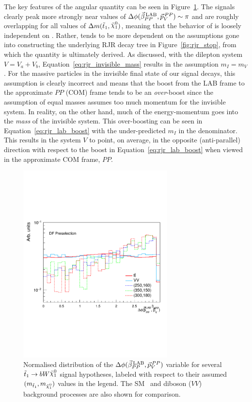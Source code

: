 The key features of the angular quantity \dpb can be seen in Figure~\ref{fig:rjr_DPB}.
The \stopone signals clearly peak more strongly near values of $\Delta \phi (\vec{\beta}_{PP}^{\,\text{LAB}}, \vec{p}_V^{\,PP}) \sim \pi$ and are roughly
overlapping for all values of $\sdiff$, meaning that the behavior of \dpb is loosely
independent on \sdiff.
Rather, \dpb tends to be more dependent on the assumptions gone into constructing the underlying
RJR decay tree in Figure~\ref{fig:rjr_stop}, from which the quantity \dpb is ultimately derived.
As discussed, with the dilepton system $V = V_a + V_b$, Equation~\ref{eq:rjr_invisible_mass} results
in the assumption $m_I = m_V$.
For the massive \ninoone particles in the invisible final state of our \stopone signal decays, this
assumption is clearly incorrect and means that the boost from the LAB frame to the approximate 
$PP$ (COM) frame tends to be an \textit{over}-boost since the assumption of equal masses assumes
too much momentum for the invisible system.
In reality, on the other hand, much of the \stopone energy-momentum goes
into the \textit{mass} of the invisible system.
This over-boosting can be seen in Equation~\ref{eq:rjr_lab_boost} with the under-predicted $m_I$
in the denominator.
This results in the system $V$ to point, on average, in the opposite (anti-parallel) direction with
respect to the boost in Equation~\ref{eq:rjr_lab_boost} when viewed in the approximate COM frame, $PP$.

\begin{figure}[!htb]
    \begin{center}
        \includegraphics[width=0.7\textwidth]{figures/search_stop2l/strategy/comp_plots/dfpresel_DPB_vSS}
        \caption{
            Normalised distribution of the $\Delta \phi (\vec{\beta}_{PP}^{\,\text{LAB}}, \vec{p}_V^{\,PP})$ variable for several $\stopone \rightarrow b W \ninoone$
            signal hypotheses, labeled with respect to their assumed $(m_{\stopone}, m_{\ninoone})$ values in the
            legend.
            The SM \ttbar~and diboson ($VV$) background processes are also shown for comparison.
        }
        \label{fig:rjr_DPB}
    \end{center}
\end{figure}

